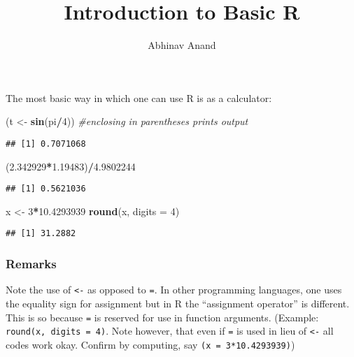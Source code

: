 \documentclass[]{article}
\title{Introduction to Basic R}
\author{Abhinav Anand}
\date{}
\newenvironment{Shaded}{\begin{snugshade}}{\end{snugshade}}
\newcommand{\KeywordTok}[1]{\textcolor[rgb]{0.13,0.29,0.53}{\textbf{#1}}}
\newcommand{\DataTypeTok}[1]{\textcolor[rgb]{0.13,0.29,0.53}{#1}}
\newcommand{\DecValTok}[1]{\textcolor[rgb]{0.00,0.00,0.81}{#1}}
\newcommand{\FloatTok}[1]{\textcolor[rgb]{0.00,0.00,0.81}{#1}}
\newcommand{\StringTok}[1]{\textcolor[rgb]{0.31,0.60,0.02}{#1}}
\newcommand{\CommentTok}[1]{\textcolor[rgb]{0.56,0.35,0.01}{\textit{#1}}}
\newcommand{\OperatorTok}[1]{\textcolor[rgb]{0.81,0.36,0.00}{\textbf{#1}}}
\newcommand{\NormalTok}[1]{#1}
\begin{document}
\maketitle

The most basic way in which one can use R is as a calculator:

\begin{Shaded}
\begin{Highlighting}[]
\NormalTok{(t <-}\StringTok{ }\KeywordTok{sin}\NormalTok{(pi}\OperatorTok{/}\DecValTok{4}\NormalTok{)) }\CommentTok{#enclosing in parentheses prints output}
\end{Highlighting}
\end{Shaded}

\begin{verbatim}
## [1] 0.7071068
\end{verbatim}

\begin{Shaded}
\begin{Highlighting}[]
\NormalTok{(}\FloatTok{2.342929}\OperatorTok{*}\FloatTok{1.19483}\NormalTok{)}\OperatorTok{/}\FloatTok{4.9802244}
\end{Highlighting}
\end{Shaded}

\begin{verbatim}
## [1] 0.5621036
\end{verbatim}

\begin{Shaded}
\begin{Highlighting}[]
\NormalTok{x <-}\StringTok{ }\DecValTok{3}\OperatorTok{*}\FloatTok{10.4293939}
\KeywordTok{round}\NormalTok{(x, }\DataTypeTok{digits =} \DecValTok{4}\NormalTok{)}
\end{Highlighting}
\end{Shaded}

\begin{verbatim}
## [1] 31.2882
\end{verbatim}

\subsubsection{Remarks}\label{remarks}

Note the use of \texttt{\textless{}-} as opposed to \texttt{=}. In other
programming languages, one uses the equality sign for assignment but in
R the ``assignment operator'' is different. This is so because
\texttt{=} is reserved for use in function arguments. (Example:
\texttt{round(x,\ digits\ =\ 4)}. Note however, that even if \texttt{=}
is used in lieu of \texttt{\textless{}-} all codes work okay. Confirm by
computing, say \texttt{(x\ =\ 3*10.4293939)})
\end{document}
